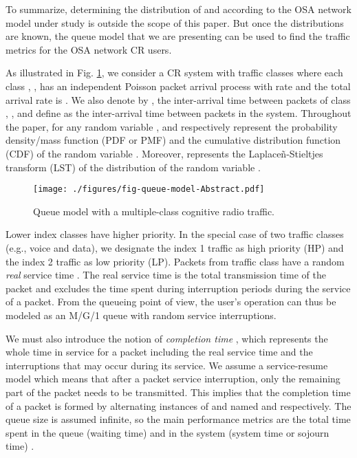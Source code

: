 \documentclass[11pt,journal,oneside,onecolumn,draftclsnofoot]{IEEEtran}
\begin{document}
To summarize, determining the distribution of  and  according to the OSA network model under study is outside the scope of this paper. But once the distributions are known, the queue model that we are presenting can be used to find the traffic metrics for the OSA network CR users.
 

As illustrated in Fig. \ref{fig-queue-model-Abstract}, we consider a CR system with  traffic classes where each class , , has an independent Poisson packet arrival process with rate  and the total arrival rate is . We also denote by , the inter-arrival time between packets of class , , and define  as the inter-arrival time between packets in the system. Throughout the paper, for any random variable ,  and  respectively represent the probability density/mass function (PDF or PMF) and the cumulative distribution function (CDF) of the random variable . Moreover,  represents the {Laplaceñ-Stieltjes} transform (LST) of the distribution  of the random variable . 
\begin{figure}\texttt{[image: ./figures/fig-queue-model-Abstract.pdf]}\caption{Queue model with a multiple-class cognitive radio traffic.}\label{fig-queue-model-Abstract}\end{figure}

Lower index classes have higher priority. In the special case of two traffic classes (e.g., voice and data), we designate the index 1 traffic as high priority (HP) and the index 2 traffic as low priority (LP). Packets from traffic class  have a random \emph{real} service time . The real service time is the total transmission time of the packet and excludes the time spent during interruption periods during the service of a packet. From the queueing point of view, the user's operation can thus be modeled as an M/G/1 queue with random service interruptions. 

We must also introduce the notion of \emph{completion time} , which represents the whole time in service for a packet including the real service time  and the interruptions that may occur during its service. We assume a service-resume model which means that after a packet service interruption, only the remaining part of the packet needs to be transmitted. This implies that the completion time of a packet is formed by alternating instances of  and  named  and  respectively. 
The queue size is assumed infinite, so the main performance metrics are the total time spent in the queue (waiting time)  and in the system (system time or sojourn time) . 
\end{document}
